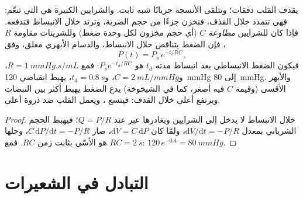 \begin{theorem}\label{thm:b2:blood-circulation:windkessel}
يقذف القلب دفقات؛ وتتلقى الأنسجة جريانًا شبه
ثابت. والشرايين الكبيرة هي التي تنعّم: فهي تتمدد خلال
القذف، فتخزن جزءًا من حجم الضربة، وترتد خلال
الانبساط فتدفعه. فإذا كان للشرايين \emph{مطاوعة}
$C$ (أي حجم مخزون لكل وحدة ضغط) وللشرينات
مقاومة $R$، فإن الضغط يتناقص خلال الانبساط، والدسام الأبهري مغلق،
وفق
\[
P(t) = P_{s}\,e^{-t/RC},
\]
فيكون الضغط الانبساطي بعد انبساط مدته $t_d$
هو $P_s e^{-t_d/RC}$: فمع $R = \qty{1}{mmHg.s/mL}$، و$C =
\qty{2}{mL/mmHg}$، و$t_d = \qty{0.8}{s}$، يهبط انقباضي
\qty{120}{mmHg} إلى \qty{80}{mmHg}. والأبهر الأقسى (وقيمة $C$ فيه أصغر،
كما في الشيخوخة) يدع الضغط يهبط أكثر بين النبضات
ويرتفع أعلى خلال القذف: فيتسع \emph{}،
ويعمل القلب ضد ذروة أعلى.
\end{theorem}
\begin{proof}
خلال الانبساط لا يدخل  إلى الشرايين ويغادرها 
عبر  عند $Q = P/R$؛ فيهبط الحجم الشرياني بمعدل
$\mathrm{d}V/\mathrm{d}t = -P/R$، ولمّا كان $\mathrm{d}V = C\,
\mathrm{d}P$، صار $C\,\mathrm{d}P/\mathrm{d}t = -P/R$، وحلها هو
الأسّي بثابت زمن $RC$. فمع $RC = \qty{2}{s}$:
$120\,e^{-0.4} = \qty{80}{mmHg}$.
\end{proof}

\section{التبادل في الشعيرات}

